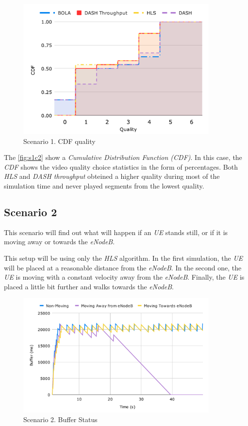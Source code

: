 \begin{figure}[h]
    \centering
    \includegraphics[width=0.9\textwidth]{img/s1c2.pdf}
    \caption{Scenario 1. CDF quality}
    \label{fig:s1c2}
\end{figure}

The \autoref{fig:s1c2} show a \textit{Cumulative Distribution Function (CDF)}. In this 
case, the \textit{CDF} shows the video quality choice statistics in the form of percentages. 
Both \textit{HLS} and \textit{DASH throughput} obteined a higher quality during most of 
the simulation time and never played segments from the lowest quality.

\subsection{Scenario 2}

This scenario will find out what will happen if an \textit{UE} stands still, or if it is moving away
or towards the \textit{eNodeB}.

This setup will be using only the \textit{HLS} algorithm. In the first simulation, the \textit{UE}
will be placed at a reasonable distance from the \textit{eNodeB}. In the second one, the \textit{UE}
is moving with a constant velocity away from the \textit{eNodeB}. Finally, the \textit{UE} is placed 
a little bit further and walks towards the \textit{eNodeB}.

\begin{figure}[h]
    \centering
    \includegraphics[width=0.9\textwidth]{img/s2c1.pdf}
    \caption{Scenario 2. Buffer Status}
    \label{fig:s2c1}
\end{figure}

